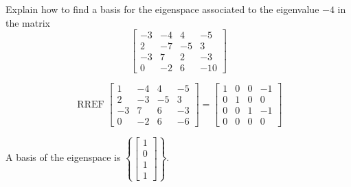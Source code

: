 
\begin{exerciseStatement}


Explain how to find a basis for the eigenspace associated to the eigenvalue \( -4 \) in the matrix \[ \left[\begin{array}{cccc}
-3 & -4 & 4 & -5 \\
2 & -7 & -5 & 3 \\
-3 & 7 & 2 & -3 \\
0 & -2 & 6 & -10
\end{array}\right] \]


\end{exerciseStatement}
    
\begin{exerciseAnswer} 


\[\operatorname{RREF} \left[\begin{array}{cccc}
1 & -4 & 4 & -5 \\
2 & -3 & -5 & 3 \\
-3 & 7 & 6 & -3 \\
0 & -2 & 6 & -6
\end{array}\right] = \left[\begin{array}{cccc}
1 & 0 & 0 & -1 \\
0 & 1 & 0 & 0 \\
0 & 0 & 1 & -1 \\
0 & 0 & 0 & 0
\end{array}\right] \]



A basis of the eigenspace is \( \left\{ \left[\begin{array}{c}
1 \\
0 \\
1 \\
1
\end{array}\right] \right\} \).


\end{exerciseAnswer}
    

